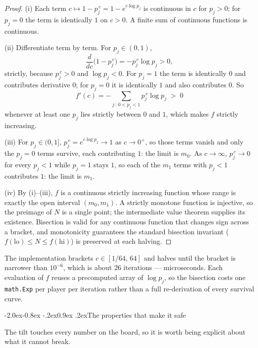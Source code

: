 \documentclass[10pt,a4paper]{article}
\makeatletter
\theoremstyle{plain}
\theoremstyle{definition}
\theoremstyle{remark}
\newcommand{\code}[1]{\texttt{\small #1}}
\newcommand{\lo}{\mathrm{lo}}
\renewcommand\subsection{\@startsection{subsection}{2}{\z@}%
  {-2.0ex\@plus -0.8ex \@minus -.2ex}{0.9ex \@plus .2ex}{\normalfont\large\bfseries}}
\makeatother
\begin{document}
\begin{proof}
(i) Each term $c \mapsto 1 - p_j^{\,c} = 1 - e^{c\log p_j}$ is continuous in $c$ for
$p_j > 0$; for $p_j = 0$ the term is identically $1$ on $c>0$. A finite sum of
continuous functions is continuous.

(ii) Differentiate term by term. For $p_j \in (0,1)$,
\[
\frac{d}{dc}\big(1 - p_j^{\,c}\big) = -p_j^{\,c}\log p_j > 0,
\]
strictly, because $p_j^{\,c} > 0$ and $\log p_j < 0$. For $p_j = 1$ the term is
identically $0$ and contributes derivative $0$; for $p_j = 0$ it is identically $1$ and
also contributes $0$. So
\begin{equation}
f'(c) = -\sum_{j\,:\,0<p_j<1} p_j^{\,c}\log p_j \;>\; 0
\label{eq:tiltderiv}
\end{equation}
whenever at least one $p_j$ lies strictly between $0$ and $1$, which makes $f$ strictly
increasing.

(iii) For $p_j \in (0,1]$, $p_j^{\,c} = e^{c \log p_j} \to 1$ as $c \to 0^+$, so those
terms vanish and only the $p_j = 0$ terms survive, each contributing $1$: the limit is
$m_0$. As $c \to \infty$, $p_j^{\,c} \to 0$ for every $p_j < 1$ while $p_j = 1$ stays
$1$, so each of the $m_1$ terms with $p_j < 1$ contributes $1$: the limit is $m_1$.

(iv) By (i)--(iii), $f$ is a continuous strictly increasing function whose range is
exactly the open interval $(m_0, m_1)$. A strictly monotone function is injective, so
the preimage of $N$ is a single point; the intermediate value theorem supplies its
existence. Bisection is valid for any continuous function that changes sign across a
bracket, and monotonicity guarantees the standard bisection invariant
($f(\lo) \le N \le f(\mathrm{hi})$) is preserved at each halving.
\end{proof}

The implementation brackets $c \in [1/64,\,64]$ and halves until the bracket is narrower
than $10^{-6}$, which is about $26$ iterations --- microseconds. Each evaluation of $f$
reuses a precomputed array of $\log p_j$, so the bisection costs one \code{math.Exp} per
player per iteration rather than a full re-derivation of every survival curve.

\subsection{The properties that make it safe}

The tilt touches every number on the board, so it is worth being explicit about what it
cannot break.
\end{document}
